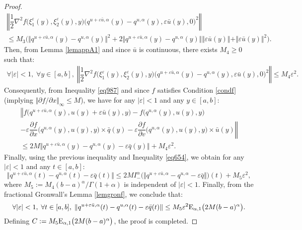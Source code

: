 \documentclass[english,11pt,reqno]{smfart}
\def\eps{\varepsilon}
\begin{document}
\begin{proof}
\begin{multline}
\left\Vert \dfrac{1}{2} \nabla^2 f \big(\xi^\eps_1(y),\xi^\eps_2(y),y \big) \big( q^{u+\eps \bar{u},\alpha} (y) - q^{u,\alpha}(y),\eps \bar{u}(y),0)^2  \right\Vert \\ \leq M_3 \big( \Vert q^{u+\eps \bar{u},\alpha} (y) - q^{u,\alpha}(y) \Vert^2  + 2 \Vert q^{u+\eps \bar{u},\alpha} (y) - q^{u,\alpha}(y) \Vert \Vert \eps \bar{u}(y) \Vert + \Vert \eps \bar{u}(y) \Vert^2 \big). 
\end{multline}
Then, from Lemma \ref{lemappA1} and since $\bar{u}$ is continuous, there exists $M_4 \geq 0$ such that:
\begin{multline}
\forall \vert \eps \vert < 1, \; \forall y \in [a,b], \; \left\Vert \dfrac{1}{2} \nabla^2 f \big(\xi^\eps_1(y),\xi^\eps_2(y),y \big) \big( q^{u+\eps \bar{u},\alpha} (y) - q^{u,\alpha}(y),\eps \bar{u}(y),0)^2  \right\Vert \leq M_4 \eps^2 .
\end{multline}
Consequently, from Inequality \eqref{eq987} and since $f$ satisfies Condition \eqref{condf} (implying $\Vert \partial f / \partial x \Vert_{\infty} \leq M$), we have for any $\vert \eps \vert < 1$ and any $y \in [a,b]$:
\begin{multline}
\left\Vert f\big(q^{u+\eps \bar{u},\alpha}(y),u(y)+\eps \bar{u}(y),y\big)-f\big(q^{u,\alpha}(y),u(y),y\big) \right. \\ \left. - \eps \dfrac{\partial f}{\partial x}\big(q^{u,\alpha}(y),u(y),y\big) \times \bar{q}(y) - \eps \dfrac{\partial f}{\partial v}\big(q^{u,\alpha}(y),u(y),y\big) \times \bar{u}(y) \right\Vert  \\ \leq 2 M \Vert q^{u+\eps \bar{u},\alpha}(y)- q^{u,\alpha}(y)-\eps \bar{q}(y) \Vert +M_4 \eps^2.
\end{multline}
Finally, using the previous inequality and Inequality \eqref{eq654}, we obtain for any $\vert \eps \vert < 1$ and any $t \in [a,b]$: 
\begin{equation}
\Vert q^{u+\eps \bar{u},\alpha}(t) - q^{u,\alpha}(t) - \eps \bar{q}(t) \Vert \leq 2 M I^\alpha_- \big( \Vert  q^{u+\eps \bar{u},\alpha} - q^{u,\alpha} - \eps \bar{q} \Vert \big) (t) +  M_5 \eps^2,
\end{equation}
where $M_5 := M_4 (b-a)^\alpha / \Gamma (1+\alpha)$ is independent of $\vert \eps \vert < 1$. Finally, from the fractional Gronwall's Lemma \ref{lemgronf}, we conclude that:
\begin{equation}
\forall \vert \eps \vert < 1, \; \forall t \in [a,b], \; \Vert q^{u+\eps \bar{u},\alpha}(t) - q^{u,\alpha}(t) - \eps \bar{q}(t)\Vert \leq  M_5 \eps^2 {\rm E}_{\alpha,1} \big( 2M(b-a)^\alpha \big).
\end{equation}
Defining $C := M_5 {\rm E}_{\alpha,1} \big( 2M (b-a)^\alpha \big)$, the proof is completed.
\end{proof}
\end{document}

